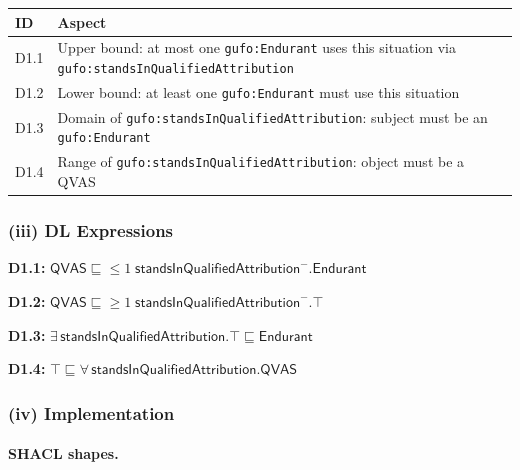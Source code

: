 \documentclass[12pt,a4paper]{article}
\newcommand{\gufoclass}[1]{\nolinkurl{gufo:#1}}
\newcommand{\gufoprop}[1]{\nolinkurl{gufo:#1}}
\begin{document}
\begin{tabular}{lL{9.5cm}}
  \toprule
  \textbf{ID} & \textbf{Aspect} \\
  \midrule
  D1.1 & Upper bound: at most one \gufoclass{Endurant} uses this situation via
         \gufoprop{standsInQualifiedAttribution} \\
  D1.2 & Lower bound: at least one \gufoclass{Endurant} must use this situation \\
  D1.3 & Domain of \gufoprop{standsInQualifiedAttribution}: subject must be
         an \gufoclass{Endurant} \\
  D1.4 & Range of \gufoprop{standsInQualifiedAttribution}: object must be a QVAS \\
  \bottomrule
\end{tabular}

\subsubsection*{(iii) DL Expressions}

\textbf{D1.1:}
$\mathsf{QVAS} \sqsubseteq {\leq}1\;\mathsf{standsInQualifiedAttribution}^{-}.\mathsf{Endurant}$

\textbf{D1.2:}
$\mathsf{QVAS} \sqsubseteq {\geq}1\;\mathsf{standsInQualifiedAttribution}^{-}.\top$

\textbf{D1.3:}
$\exists\,\mathsf{standsInQualifiedAttribution}.\top \sqsubseteq \mathsf{Endurant}$

\textbf{D1.4:}
$\top \sqsubseteq \forall\,\mathsf{standsInQualifiedAttribution}.\mathsf{QVAS}$

\subsubsection*{(iv) Implementation}

\paragraph{SHACL shapes.}
\end{document}
